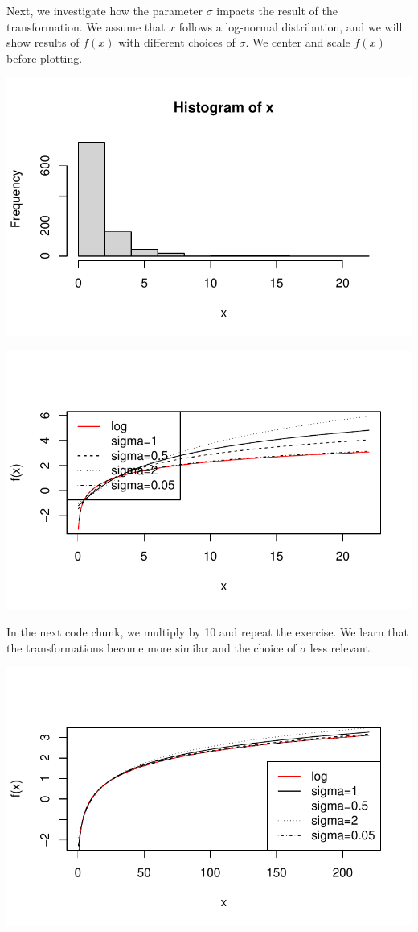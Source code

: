 \documentclass[
  letterpaper,
  DIV=11,
  numbers=noendperiod]{scrreport}
\begin{document}
Next, we investigate how the parameter \(\sigma\) impacts the result of
the transformation. We assume that \(x\) follows a log-normal
distribution, and we will show results of \(f(x)\) with different
choices of \(\sigma\). We center and scale \(f(x)\) before plotting.

\includegraphics{./Pseudo_log_explainer_files/figure-pdf/pl03-1.pdf}

\includegraphics{./Pseudo_log_explainer_files/figure-pdf/pl03-2.pdf}

In the next code chunk, we multiply by 10 and repeat the exercise. We
learn that the transformations become more similar and the choice of
\(\sigma\) less relevant.

\includegraphics{./Pseudo_log_explainer_files/figure-pdf/pl04-1.pdf}
\end{document}
